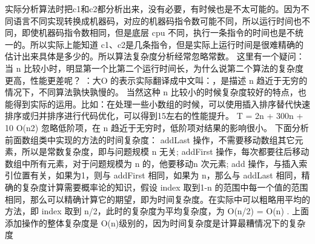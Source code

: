 {}实际分析算法时把c1和c2都分析出来，没有必要，有时候也是不太可能的。因为不同语言不同实现转换成机器码，对应的机器码指令数可能不同，所以运行时间也不同，即使机器码指令数相同，但是底层 cpu 不同，执行一条指令的时间也是不统一的。所以实际上能知道 c1、c2是几条指令，但是实际上运行时间是很难精确的估计出来具体是多少的。所以算法复杂度分析经常忽略常数。\markdownRendererInterblockSeparator
{}\markdownRendererInterblockSeparator
{}这里有一个疑问：当 n 比较小时，明显第一个比第二个运行时间长，为什么说第二个算法的复杂度更高，性能更差呢？ ：大O 的表示实际翻译成中文叫：，是描述 n 趋近于无穷的情况下，不同算法孰快孰慢的。\markdownRendererInterblockSeparator
{}当然这种 n 比较小的时候复杂度较好的特点，也能得到实际的运用。比如：在处理一些小数组的时候，可以使用插入排序替代快速排序或归并排序进行代码优化，可以得到15\markdownRendererPercentSign{}左右的性能提升。\markdownRendererInterblockSeparator
{}\markdownRendererDollarSign{}T = 2n + 300n + 10\markdownRendererDollarSign{} \markdownRendererDollarSign{}O(n\markdownRendererCircumflex{}2)\markdownRendererDollarSign{} 忽略低阶项，在 n 趋近于无穷时，低阶项对结果的影响很小。\markdownRendererInterblockSeparator
{}下面分析前面数组类中实现的方法的时间复杂度： \markdownRendererInterblockSeparator
{}addLast 操作，不需要移动数组其它元素，所以是常数复杂度，即与问题规模 n 无关; addFirst 操作，每次都要往后移动数组中所有元素，对于问题规模为 n 的，他要移动n 次元素; add 操作，与插入索引位置有关，如果为1，则与 addFirst 相同，如果为 n，那么与 addLast 相同，精确的复杂度计算需要概率论的知识，假设 index 取到1-n 的范围中每一个值的范围相同，那么可以精确计算它的期望，即为时间复杂度。在实际中可以粗略用平均的方法，即 index 取到 n/2，此时的复杂度为平均复杂度，为 O(n/2) = O(n) .\markdownRendererInterblockSeparator
{} 上面添加操作的整体复杂度是 O(n)级别的，因为时间复杂度是计算最糟情况下的复杂度\markdownRendererInterblockSeparator
{}\markdownRendererInterblockSeparator
{} \markdownRendererInterblockSeparator
